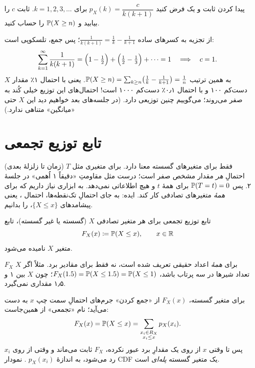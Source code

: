 \begin{example}[label=ex:heavy-tail]{پیدا کردن ثابت و یک }
فرض کنید $p_X(k)=\dfrac{c}{k(k+1)}$ برای $k=1,2,3,\dots$. ثابت $c$ را بیابید و $\P(X\ge n)$ را حساب کنید.
\begin{solution}
از تجزیه به کسرهای ساده $\frac1{k(k+1)}=\frac1k-\frac1{k+1}$؛ پس جمع، تلسکوپی است:
\[ \sum_{k=1}^{\infty}\frac{1}{k(k+1)}=\Bigl(1-\tfrac12\Bigr)+\Bigl(\tfrac12-\tfrac13\Bigr)+\cdots=1\quad\Longrightarrow\quad c=1. \]
به همین ترتیب $\P(X\ge n)=\sum_{k\ge n}\bigl(\frac1k-\frac1{k+1}\bigr)=\frac1n$. یعنی با احتمال ۱٪ مقدار $X$ دست‌کم ۱۰۰ و با احتمال ۰٫۱٪ دست‌کم ۱۰۰۰ است! احتمال‌های این توزیع خیلی کُند به صفر می‌روند؛ می‌گوییم چنین توزیعی \emph{} دارد. (در جلسه‌های بعد خواهیم دید این $X$ حتی «میانگین» متناهی ندارد.)
\end{solution}
\end{example}

\section{تابع توزیع تجمعی}
\label{sec:cdf}

 فقط برای متغیرهای گسسته معنا دارد. برای متغیری مثل $T$ (زمان تا زلزلهٔ بعدی) احتمالِ \emph{هر} مقدار مشخص صفر است؛ درست مثل مقاومتِ «دقیقاً ۱ اُهمی» در جلسهٔ ۲. پس $\P(T=t)=0$ برای همهٔ $t$ و  هیچ اطلاعاتی نمی‌دهد. به ابزاری نیاز داریم که برای \emph{همهٔ} متغیرهای تصادفی کار کند. ایده: به جای احتمالِ تک‌نقطه‌ها، احتمال ، یعنی پیشامدهای $\{X\le x\}$، را بدانیم.

\begin{definition}[label=def:cdf]{تابع توزیع تجمعی}
برای هر متغیر تصادفی $X$ (گسسته یا غیر گسسته)، تابع
\[ F_X(x)\defeq\P(X\le x),\qquad x\in\R \]
 متغیر $X$ نامیده می‌شود.
\end{definition}

\begin{note}
$F_X$ برای \emph{همهٔ} اعداد حقیقی تعریف شده است، نه فقط برای مقادیر برد. مثلاً اگر $X$ تعداد شیرها در سه پرتاب باشد، $F_X(1.5)=\P(X\le1.5)=\P(X\le1)$؛ چون $X$ بین ۱ و ۱٫۵ مقداری نمی‌گیرد.
\end{note}

برای متغیر گسسته، $F_X(x)$ از «جمع کردن» جرم‌های احتمالِ سمت چپ $x$ به دست می‌آید؛ نام «تجمعی» از همین‌جاست:
\[ F_X(x)=\P(X\le x)=\sum_{\substack{x_i\in R_X\\ x_i\le x}}p_X(x_i). \]
پس تا وقتی $x$ از روی یک مقدارِ برد عبور نکرده، $F_X$ ثابت می‌ماند و وقتی از روی $x_i$ رد می‌شود، به اندازهٔ $p_X(x_i)$ . نمودار CDF یک متغیر گسسته \emph{پله‌ای} است.

